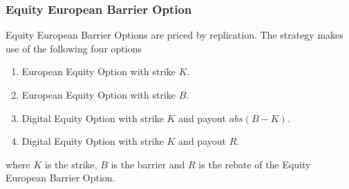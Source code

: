 \subsubsection{Equity European Barrier Option}
\label{pricing:eq_europeanbarrieroption}

Equity European Barrier Options are priced by replication.
The strategy makes use of the following four options
\begin{enumerate}
\item European Equity Option with strike $K$.
\item European Equity Option with strike $B$.
\item Digital Equity Option with strike $K$ and payout $abs(B-K)$.
\item Digital Equity Option with strike $K$ and payout $R$.
\end{enumerate}
where $K$ is the strike, $B$ is the barrier and $R$ is the rebate of the Equity European Barrier Option.